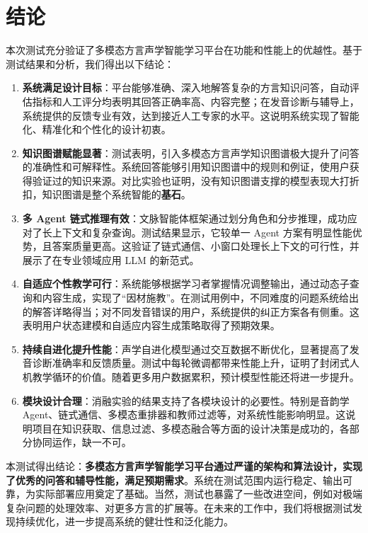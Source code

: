 \section{结论}
本次测试充分验证了多模态方言声学智能学习平台在功能和性能上的优越性。基于测试结果和分析，我们得出以下结论：
\begin{enumerate}
    \item \textbf{系统满足设计目标}：平台能够准确、深入地解答复杂的方言知识问答，自动评估指标和人工评分均表明其回答正确率高、内容完整；在发音诊断与辅导上，系统提供的反馈专业有效，达到接近人工专家的水平。这说明系统实现了智能化、精准化和个性化的设计初衷。
    \item \textbf{知识图谱赋能显著}：测试表明，引入多模态方言声学知识图谱极大提升了问答的准确性和可解释性。系统回答能够引用知识图谱中的规则和例证，使用户获得验证过的知识来源。对比实验也证明，没有知识图谱支撑的模型表现大打折扣，知识图谱是整个系统智能的\textbf{基石}。
    \item \textbf{多 Agent 链式推理有效}：文脉智能体框架通过划分角色和分步推理，成功应对了长上下文和复杂查询。测试结果显示，它较单一 Agent 方案有明显性能优势，且答案质量更高。这验证了链式通信、小窗口处理长上下文的可行性，并展示了在专业领域应用 LLM 的新范式。
    \item \textbf{自适应个性教学可行}：系统能够根据学习者掌握情况调整输出，通过动态子查询和内容生成，实现了“因材施教”。在测试用例中，不同难度的问题系统给出的解答详略得当；对不同发音错误的用户，系统提供的纠正方案各有侧重。这表明用户状态建模和自适应内容生成策略取得了预期效果。
    \item \textbf{持续自进化提升性能}：声学自进化模型通过交互数据不断优化，显著提高了发音诊断准确率和反馈质量。测试中每轮微调都带来性能上升，证明了封闭式人机教学循环的价值。随着更多用户数据累积，预计模型性能还将进一步提升。
    \item \textbf{模块设计合理}：消融实验的结果支持了各模块设计的必要性。特别是音韵学 Agent、链式通信、多模态重排器和教师过滤等，对系统性能影响明显。这说明项目在知识获取、信息过滤、多模态融合等方面的设计决策是成功的，各部分协同运作，缺一不可。
\end{enumerate}

本测试得出结论：\textbf{多模态方言声学智能学习平台通过严谨的架构和算法设计，实现了优秀的问答和辅导性能，满足预期需求}。系统在测试范围内运行稳定、输出可靠，为实际部署应用奠定了基础。当然，测试也暴露了一些改进空间，例如对极端复杂问题的处理效率、对更多方言的扩展等。在未来的工作中，我们将根据测试发现持续优化，进一步提高系统的健壮性和泛化能力。
